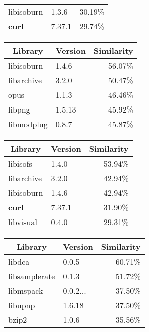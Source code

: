 \documentclass[twocolumn,a4paper]{IEEEtran} %
\newlength{\subfigwidth}
\begin{document}
\begin{table*}[t]
\begin{subtable}{\subfigwidth}
\begin{tabular}[c]{ll|r}
        libisoburn &  1.3.6      & 30.19\% \\
        \textbf{curl} &  7.37.1  & 29.74\% \\
        \bottomrule
        \end{tabular}
        \caption{\texttt{cc1}}
    \end{subtable}
    \begin{subtable}[c]{\subfigwidth}
      \centering
        \begin{tabular}[c]{ll|r}
        \toprule
        \multicolumn{1}{c}{Library} & \multicolumn{1}{c|}{Version} & \multicolumn{1}{c}{Similarity} \\
        \midrule
        libisoburn &  1.4.6  & 56.07\% \\
        libarchive &  3.2.0  & 50.47\% \\
        opus       &  1.1.3  & 46.46\% \\
        libpng     &  1.5.13 & 45.92\% \\
        libmodplug &  0.8.7  & 45.87\% \\
        \bottomrule
        \end{tabular}
        \caption{\texttt{cc2}}
    \end{subtable}
    \begin{subtable}[c]{\subfigwidth}
      \centering
        \begin{tabular}[c]{ll|r}
        \toprule
        \multicolumn{1}{c}{Library} & \multicolumn{1}{c|}{Version} & \multicolumn{1}{c}{Similarity} \\
        \midrule
        libisofs   & 1.4.0  & 53.94\% \\
        libarchive & 3.2.0  & 42.94\% \\
        libisoburn & 1.4.6  & 42.94\% \\
        \textbf{curl} & 7.37.1 & 31.90\% \\
        libvisual  & 0.4.0  & 29.31\% \\
        \bottomrule
        \end{tabular}
        \caption{\texttt{cc3}}
    \end{subtable}
    \begin{subtable}[c]{\subfigwidth}
      \centering
        \begin{tabular}[c]{ll|r}
        \toprule
        \multicolumn{1}{c}{Library} & \multicolumn{1}{c|}{Version} & \multicolumn{1}{c}{Similarity} \\
        \midrule
        libdca        &  0.0.5  & 60.71\% \\
        libsamplerate &  0.1.3  & 51.72\% \\
        libmspack     &  0.0.2...\footnotemark  & 37.50\% \\
        libupnp       &  1.6.18 & 37.50\% \\
        bzip2         &  1.0.6  & 35.56\% \\        
        \bottomrule
        \end{tabular}
        \caption{\texttt{bloom}}
    \end{subtable}
    

\end{table*}
\end{document}
